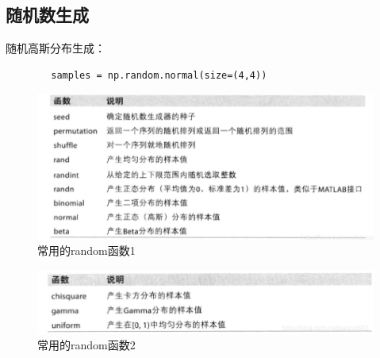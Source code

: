 \documentclass{article}
\begin{document}
	\subsection{随机数生成}
	\noindent 随机高斯分布生成：
	\begin{lstlisting}
		samples = np.random.normal(size=(4,4))
	\end{lstlisting}

	\begin{figure}[htbp]
		\centering
	\includegraphics[width=\linewidth]{fig/np_7}
	\caption{常用的random函数1}
	\end{figure}
	\begin{figure}[htbp]
	\centering
	\includegraphics[width=\linewidth]{fig/np_8}
	\caption{常用的random函数2}
\end{figure}
\end{document}
